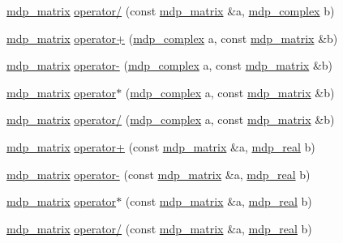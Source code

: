 \begin{DoxyCompactItemize}
\item 
\hyperlink{classmdp__matrix}{mdp\+\_\+matrix} \hyperlink{classmdp__matrix_afaf1606b270d6b334329a5cdf9a1c959}{operator/} (const \hyperlink{classmdp__matrix}{mdp\+\_\+matrix} \&a, \hyperlink{classmdp__complex}{mdp\+\_\+complex} b)
\item 
\hyperlink{classmdp__matrix}{mdp\+\_\+matrix} \hyperlink{classmdp__matrix_a179b66f81eb9cc41cf4e47424fbb043a}{operator+} (\hyperlink{classmdp__complex}{mdp\+\_\+complex} a, const \hyperlink{classmdp__matrix}{mdp\+\_\+matrix} \&b)
\item 
\hyperlink{classmdp__matrix}{mdp\+\_\+matrix} \hyperlink{classmdp__matrix_a505c39c420588b8e6d1071a01509ed43}{operator-\/} (\hyperlink{classmdp__complex}{mdp\+\_\+complex} a, const \hyperlink{classmdp__matrix}{mdp\+\_\+matrix} \&b)
\item 
\hyperlink{classmdp__matrix}{mdp\+\_\+matrix} \hyperlink{classmdp__matrix_a99f6d1150215e2cb7b00de4b6aa04633}{operator$\ast$} (\hyperlink{classmdp__complex}{mdp\+\_\+complex} a, const \hyperlink{classmdp__matrix}{mdp\+\_\+matrix} \&b)
\item 
\hyperlink{classmdp__matrix}{mdp\+\_\+matrix} \hyperlink{classmdp__matrix_a5a1dfe012e3c2ab574f2c60f943b36e3}{operator/} (\hyperlink{classmdp__complex}{mdp\+\_\+complex} a, const \hyperlink{classmdp__matrix}{mdp\+\_\+matrix} \&b)
\item 
\hyperlink{classmdp__matrix}{mdp\+\_\+matrix} \hyperlink{classmdp__matrix_a2e4fb3c9d1e2be0e26120a1947eb895a}{operator+} (const \hyperlink{classmdp__matrix}{mdp\+\_\+matrix} \&a, \hyperlink{mdp__global__vars_8h_a69d96b74c791e0bbdb888b3913a69450}{mdp\+\_\+real} b)
\item 
\hyperlink{classmdp__matrix}{mdp\+\_\+matrix} \hyperlink{classmdp__matrix_aa6a8885aa8604478e5e4481e1f10d700}{operator-\/} (const \hyperlink{classmdp__matrix}{mdp\+\_\+matrix} \&a, \hyperlink{mdp__global__vars_8h_a69d96b74c791e0bbdb888b3913a69450}{mdp\+\_\+real} b)
\item 
\hyperlink{classmdp__matrix}{mdp\+\_\+matrix} \hyperlink{classmdp__matrix_a8edf780fc5b5509630fda4dba30c8b87}{operator$\ast$} (const \hyperlink{classmdp__matrix}{mdp\+\_\+matrix} \&a, \hyperlink{mdp__global__vars_8h_a69d96b74c791e0bbdb888b3913a69450}{mdp\+\_\+real} b)
\item 
\hyperlink{classmdp__matrix}{mdp\+\_\+matrix} \hyperlink{classmdp__matrix_af30fb437e246a2f03a7b9c22a0e6624a}{operator/} (const \hyperlink{classmdp__matrix}{mdp\+\_\+matrix} \&a, \hyperlink{mdp__global__vars_8h_a69d96b74c791e0bbdb888b3913a69450}{mdp\+\_\+real} b)

\end{DoxyCompactItemize}
